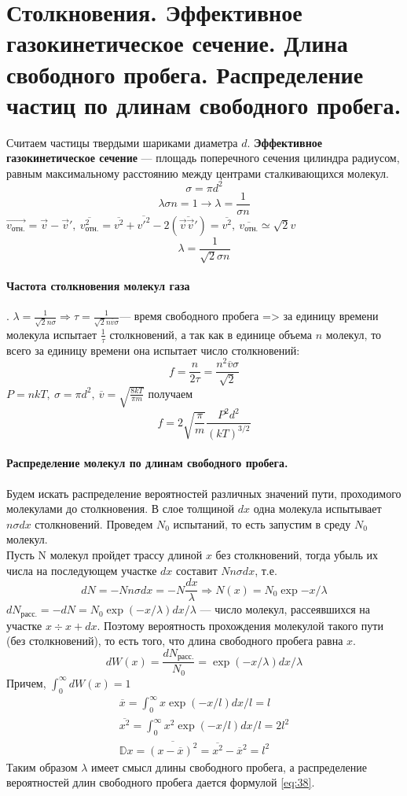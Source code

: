 \section{\normalsize Столкновения. Эффективное газокинетическое сечение. Длина свободного пробега. Распределение частиц по длинам свободного пробега.}
Считаем частицы твердыми шариками диаметра $d$. \textbf{Эффективное газокинетическое сечение} --- площадь поперечного сечения цилиндра радиусом, равным максимальному расстоянию между центрами сталкивающихся молекул.
\[
\sigma =\pi d^2
\]
\[
\lambda\sigma n=1\rightarrow\lambda=\frac{1}{\sigma n}
\]
$\overrightarrow{v_\text{отн.}}=\overrightarrow{v}-\overrightarrow{v}',\ \overline{v_\text{отн.}^2}=\overline{v^2}+\overline{v'^2}-2(\overline{\overrightarrow{v}\overrightarrow{v}'})=\overline{v^2},\ \overline{v_\text{отн.}}\simeq\sqrt{2}v$
\[
\lambda=\frac{1}{\sqrt{2}\sigma n}
\]
\paragraph{Частота столкновения молекул газа}. $\lambda=\frac{1}{\sqrt{2}n\sigma}\Rightarrow\tau=\frac{1}{\sqrt{2}n\overline{v}\sigma}$--- время свободного пробега => за единицу времени молекула испытает $\frac{1}{\tau}$ столкновений, а так как в единице объема $n$ молекул, то всего за единицу времени она испытает число столкновений:
\[
f=\frac{n}{2\tau}=\frac{n^2\overline{v}\sigma}{\sqrt{2}}
\]
$P=nkT,\ \sigma=\pi d^2,\ \overline{v}=\sqrt{\frac{8kT}{\pi m}}$ получаем
\[
f=2\sqrt{\frac{\pi}{m}}\frac{P^2d^2}{(kT)^{3/2}}
\]
\paragraph{Распределение молекул по длинам свободного пробега.} Будем искать распределение вероятностей различных значений пути, проходимого молекулами до столкновения. В слое толщиной $dx$ одна молекула испытывает $n\sigma dx$ столкновений. Проведем $N_0$ испытаний, то есть запустим в среду $N_0$ молекул.\\
Пусть N молекул пройдет трассу длиной $x$ без столкновений, тогда убыль их числа на последующем участке $dx$ составит $Nn\sigma dx$, т.е. 
\[
dN=-Nn\sigma dx=-N\frac{dx}{\lambda}\Rightarrow N(x)=N_0\exp{-x/\lambda}
\]
$dN_\text{расс.}=-dN=N_0\exp(-x/\lambda)dx/\lambda$ --- число молекул, рассеявшихся на участке $x\div x+dx$. Поэтому вероятность прохождения молекулой такого пути (без столкновений), то есть того, что длина свободного пробега равна $x$.
\begin{equation}
\label{eq:38}
dW(x)=\frac{dN_\text{расс.}}{N_0}=\exp(-x/\lambda)dx/\lambda
\end{equation}
Причем, $\int_{0}^{\infty}dW(x)=1$
\begin{align*}
\overline{x}=\int_{0}^{\infty}x\exp(-x/l)dx/l=l\\
\overline{x^2}=\int_{0}^{\infty}x^2\exp(-x/l)dx/l=2l^2\\
\mathbb{D}x=\overline{(x-\overline{x})^2}=\overline{x^2}-\overline{x}^2=l^2
\end{align*}
 Таким образом $\lambda$ имеет смысл длины свободного пробега, а распределение вероятностей длин свободного пробега дается формулой \eqref{eq:38}.